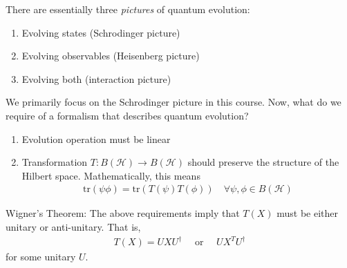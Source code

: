 \documentclass[../../note.tex]{subfiles}
\begin{document}
There are essentially three \textit{pictures} of quantum evolution:
\begin{enumerate}
    \item Evolving states (Schrodinger picture)
    \item Evolving observables (Heisenberg picture)
    \item Evolving both (interaction picture)
\end{enumerate}
We primarily focus on the Schrodinger picture in this course. Now, what do we require of a formalism that describes quantum evolution? 
\begin{enumerate}
    \item Evolution operation must be linear
    \item Transformation $T: B(\mathcal{H})\rightarrow B(\mathcal{H})$ should preserve the structure of the Hilbert space. Mathematically, this means
    \begin{align}
        \text{tr}(\psi \phi) = \text{tr}(T(\psi)T(\phi)) \quad \forall \psi,\phi \in B(\mathcal{H})
    \end{align}
\end{enumerate}

\begin{theorem}
Wigner's Theorem: The above requirements imply that $T(X)$ must be either unitary or anti-unitary. That is,
\begin{align}
    T(X) = UXU^{\dagger} \quad \text{ or } \quad U X^T U^{\dagger} 
\end{align}
for some unitary $U$. 
\end{theorem}
\end{document}
